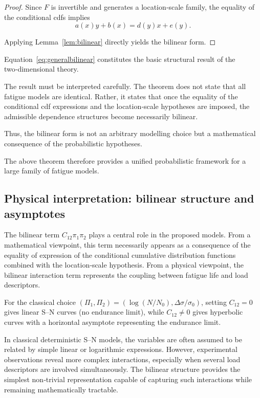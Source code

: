 \begin{proof}
Since $F$ is invertible and generates a location‑scale family, the equality of the conditional cdfs implies
\[
a(x)y+b(x)=d(y)x+e(y).
\]

Applying Lemma~\ref{lem:bilinear} directly yields the bilinear form.
\end{proof}

Equation~\eqref{eq:generalbilinear} constitutes the basic structural result of the two‑dimensional theory.

The result must be interpreted carefully. The theorem does not state that all fatigue models are identical. Rather, it states that once the equality of the conditional cdf expressions and the location‑scale hypotheses are imposed, the admissible dependence structures become necessarily bilinear.

Thus, the bilinear form is not an arbitrary modelling choice but a mathematical consequence of the probabilistic hypotheses.

The above theorem therefore provides a unified probabilistic framework for a large family of fatigue models.

\subsection{Physical interpretation: bilinear structure and asymptotes}

The bilinear term $C_{12}\pi_1\pi_2$ plays a central role in the proposed models. From a mathematical viewpoint, this term necessarily appears as a consequence of the equality of expression of the conditional cumulative distribution functions combined with the location‑scale hypothesis. From a physical viewpoint, the bilinear interaction term represents the coupling between fatigue life and load descriptors.

For the classical choice $(\Pi_1,\Pi_2)=(\log(N/N_0),\Delta\sigma/\sigma_0)$, setting $C_{12}=0$ gives linear S–N curves (no endurance limit), while $C_{12}\neq0$ gives hyperbolic curves with a horizontal asymptote representing the endurance limit.





In classical deterministic S–N models, the variables are often assumed to be related by simple linear or logarithmic expressions. However, experimental observations reveal more complex interactions, especially when several load descriptors are involved simultaneously. The bilinear structure provides the simplest non‑trivial representation capable of capturing such interactions while remaining mathematically tractable.



